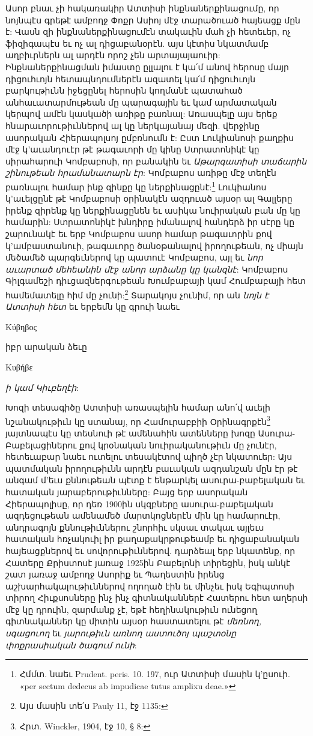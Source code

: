 \documentclass{article}
\begin{document}
{Ասոր բնաւ չի հակառակիր Ատտիսի ինքնաներքինացումը, որ նոյնպէս գրեթէ ամբողջ Փոքր Ասիոյ մէջ տարածուած հայեացք մըն է: Վասն զի ինքնաներքինացումէն տակաւին մահ չի հետեւեր, ոչ ֆիզիգապէս եւ ոչ ալ դիցաբանօրէն. այս կէտիս նկատմամբ աղբիւրներն ալ արդէն որոշ չեն արտայայաուիր: Ինքնաներքինացման իմաստը ըլլալու է կա՛մ անով հերոսը մայր դիցուհւոյն հետապնդումներէն ազատել կա՛մ դիցուհւոյն բարկութիւնն իջեցընել հերոսին կողմանէ պատահած անհաւատարմութեան մը պարագային եւ կամ արմատական կերպով ամէն կասկածի առիթը բառնալ: Առասպելը այս երեք հնարաւորութիւններով ալ կը ներկայանայ մեզի. վերջինը ասորական Հիերապոլսոյ ըմբռնումն է: Ըստ Լուկիանոսի քաղքիս մէջ կ'աւանդուէր թէ թագաւորի մը կինը Ստրատոնիկէ կը սիրահարուի Կոմբաբոսի, որ բանակին եւ \emph{Աթարգատիսի տաճարին շինութեան հրամանատարն էր}: Կոմբաբոս առիթը մէջ տեղէն բառնալու համար ինք զինքը կը ներքինացընէ:\footnote{Հմմտ. նաեւ Prudent. peris. 10. 197, ուր Ատտիսի մասին կ'ըսուի. «per sectum dedecus ab impudicae tutus amplixu deae.»} Լուկիանոս կ'աւելցընէ թէ Կոմբաբոսի օրինակէն ազդուած այսօր ալ Գալլերը իրենք զիրենք կը ներքինացընեն եւ ասիկա նուիրական բան մը կը համարին: Ստրատոնիկէ խնդիրը իմանալով հանդերձ իր սէրը կը շարունակէ եւ երբ Կոմբաբոս ասոր համար թագաւորին քով կ'ամբաստանուի, թագաւորը ծանօթանալով իրողութեան, ոչ միայն մեծամեծ պարգեւներով կը պատուէ Կոմբաբոս, այլ եւ \emph{նոր աւարտած մեհեանին մէջ անոր արձանը կը կանզնէ}: Կոմբաբոս Գիլգամեշի դիւցազներգութեան Խումբաբայի կամ Հումբաբայի հետ համեմատելը հիմ մը չունի:\footnote{Այս մասին տե՛ս Pauly 11, էջ 1135:} Տարակոյս չունիմ, որ ան \emph{նոյն է Ատտիսի հետ} եւ երբեմն կը գրուի նաեւ \begin{greek}Κύβηβος\end{greek} իբր արական ձեւը \begin{greek}Κυβήβε\end{greek} \emph{ի կամ Կիւբեղէի}:

Խոզի տեսագիծը Ատտիսի առասպելին համար անո՛վ աւելի նշանակութիւն կը ստանայ, որ Համուրաբբիի Օրինագրքէն\footnote{Հրտ. Winckler, 1904, էջ 10, § 8:} յայտնապէս կը տեսնուի թէ ամենահին ատենները խոզը Ասուրա-Բաբելացիներու քով կրօնական նուիրականութիւն մը չունէր, հետեւաբար նաեւ ուտելու տեսակէտով պիղծ չէր նկատուեր: Այս պատմական իրողութիւնն արդէն բաւական ազդանշան մըն էր թէ անգամ մ'եւս քննութեան պէտք է ենթարկել ասուրա-բաբելական եւ հատական յարաբերութիւնները: Բայց երբ ասորական Հիերապոլիսը, որ դեռ 1900ին սկզբները ասուրա-բաբելական ազդեցութեան ամենամեծ մարտկոցներէն մին կը համարուէր, անդրագոյն քննութիւններու շնորհիւ սկսաւ տակաւ այլեւս հատական հռչակուիլ իր քաղաքակրթութեամբ եւ դիցաբանական հայեացքներով եւ սովորութիւններով. դարձեալ երբ նկատենք, որ Հատերը Քրիստոսէ յառաջ 1925ին Բաբելոնի տիրեցին, իսկ անկէ շատ յառաջ ամբողջ Ասորիք եւ Պաղեստին իրենց աշխարհակալութիւններով ողողած էին եւ մինչեւ իսկ Եգիպտոսի տիրող Հիւքսոսները ինչ ինչ գիտնականներէ Հատերու հետ աղերսի մէջ կը դրուին, զարմանք չէ, եթէ հեղինակութիւն ունեցող գիտնականներ կը միտին այսօր հաստատելու թէ \emph{մեռնող, սգացուող} եւ \emph{յարութիւն առնող աստուծոյ պաշտօնը փոքրասիական ծագում ունի}:

}
\end{document}
